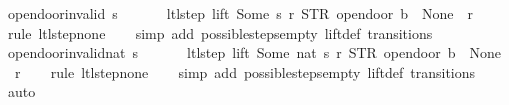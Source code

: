 \begin{isabellebody}
\endisatagproof
{\isafoldproof}%
%
\isadelimproof
\isanewline
%
\endisadelimproof
\isanewline
{}\isamarkupfalse%
\ opendoor{\isacharunderscore}invalid{\isacharcolon}\ {\isachardoublequoteopen}s\ {\isasymnotin}\ {\isacharbraceleft}{}{\isacharcomma}\ {}{\isacharcomma}\ {}{\isacharcomma}\ {}{\isacharbraceright}\ {\isasymLongrightarrow}\ ltl{\isacharunderscore}step\ lift\ {\isacharparenleft}Some\ s{\isacharparenright}\ r\ {\isacharparenleft}STR\ {\isacharprime}{\isacharprime}opendoor{\isacharprime}{\isacharprime}{\isacharcomma}\ b{\isacharparenright}\ {\isacharequal}\ {\isacharparenleft}None{\isacharcomma}\ {\isacharbrackleft}{\isacharbrackright}{\isacharcomma}\ r{\isacharparenright}{\isachardoublequoteclose}\isanewline
%
\isadelimproof
\ \ %
\endisadelimproof
%
\isatagproof
{}\isamarkupfalse%
\ {\isacharparenleft}rule\ ltl{\isacharunderscore}step{\isacharunderscore}none{\isacharparenright}\isanewline
\ \ \isamarkupfalse%
\ {\isacharparenleft}simp\ add{\isacharcolon}\ possible{\isacharunderscore}steps{\isacharunderscore}empty\ lift{\isacharunderscore}def\ transitions{\isacharparenright}%
\endisatagproof
{\isafoldproof}%
%
\isadelimproof
\isanewline
%
\endisadelimproof
\isanewline
{}\isamarkupfalse%
\ opendoor{\isacharunderscore}invalid{\isacharunderscore}nat{\isacharcolon}\ {\isachardoublequoteopen}s\ {\isasymnotin}\ {\isacharbraceleft}{}{\isacharcomma}\ {}{\isacharcomma}\ {}{\isacharcomma}\ {}{\isacharbraceright}\ {\isasymLongrightarrow}\ ltl{\isacharunderscore}step\ lift\ {\isacharparenleft}Some\ {\isacharparenleft}nat\ s{\isacharparenright}{\isacharparenright}\ r\ {\isacharparenleft}STR\ {\isacharprime}{\isacharprime}opendoor{\isacharprime}{\isacharprime}{\isacharcomma}\ b{\isacharparenright}\ {\isacharequal}\ {\isacharparenleft}None{\isacharcomma}\ {\isacharbrackleft}{\isacharbrackright}{\isacharcomma}\ r{\isacharparenright}{\isachardoublequoteclose}\isanewline
%
\isadelimproof
\ \ %
\endisadelimproof
%
\isatagproof
{}\isamarkupfalse%
\ {\isacharparenleft}rule\ ltl{\isacharunderscore}step{\isacharunderscore}none{\isacharparenright}\isanewline
\ \ \isamarkupfalse%
\ {\isacharparenleft}simp\ add{\isacharcolon}\ possible{\isacharunderscore}steps{\isacharunderscore}empty\ lift{\isacharunderscore}def\ transitions{\isacharparenright}\isanewline
\ \ \isamarkupfalse%
\ auto%
\endisatagproof
{\isafoldproof}%
%
\isadelimproof
\isanewline
%
\endisadelimproof
\isanewline

\end{isabellebody}
